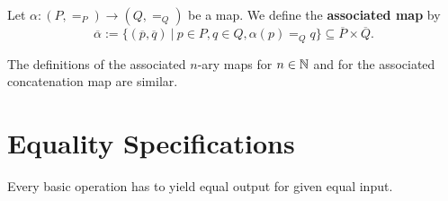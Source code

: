 \begin{definition}
 Let $\alpha: (P, =_P) \rightarrow (Q, =_Q)$ be a \GAP map. We define the \textbf{associated map} by
 \[
  \overline{\alpha} := \{ (\overline{p}, \overline{q}) ~|~ p \in P, q \in Q, \alpha( p ) =_{Q} q \} \subseteq \overline{P} \times \overline{Q}.
 \]
\end{definition}

The definitions of the associated $n$-ary maps for $n \in \mathbb{N}$ and for the associated concatenation map are similar.

\section{Equality Specifications}
\label{section:equality_specifications}

\begin{specification}
 Every basic operation has to yield equal output for given equal input.
 \end{specification}

